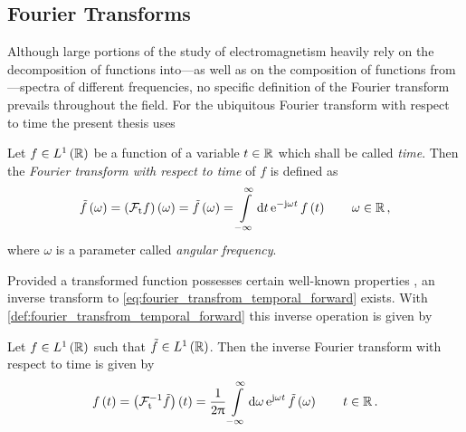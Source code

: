 \subsection{Fourier Transforms}

Although large portions of the study of electromagnetism heavily rely on the
decomposition of functions into---as well as on the composition of functions
from---spectra of different frequencies, no specific definition of the Fourier
transform prevails throughout the field.
For the ubiquitous Fourier transform with respect to time the present thesis
uses
\begin{definition}
	\label{def:fourier_transfrom_temporal_forward}
	Let $f \in L^1\left( \mathbb{R} \right)$ be a function of a variable $t \in \mathbb{R}$
	which shall be called \emph{time}.
	Then the \emph{Fourier transform with respect to time} of $f$ is defined as 
	\begin{equation}\label{eq:fourier_transfrom_temporal_forward}
		\tilde{f} \left(\omega\right) = 
		\left( \mathcal{F}_{\mathrm{t}} f \right) \left(\omega\right) = 
		\tilde{f} \left( \omega \right) =
		\int\limits_{-\infty}^{\infty} \mathrm{d} t \,
		\mathrm{e}^{-\mathrm{j} \omega t}\, 
		f\left( t \right)
		\qquad \omega \in \mathbb{R}
		\, ,
	\end{equation}
	where $\omega$ is a parameter called \emph{angular frequency}.
\end{definition}
Provided a transformed function possesses certain well-known properties
\cite{heuser2006, strichartz2003}, an inverse transform to
\eqref{eq:fourier_transfrom_temporal_forward} exists.
With \cref{def:fourier_transfrom_temporal_forward}  this inverse operation is
given by
\begin{lemma}
	Let $f \in L^1 \left(\mathbb{R}\right)$ such that
	$\tilde{f} \in L^1 \left(\mathbb{R}\right)$. Then the
	inverse Fourier transform with respect to time is given by
	\begin{equation}\label{eq:fourier_transform_temporal_backward}
		f \left(t\right) =
		\left( \mathcal{F}_{\mathrm{t}}^{-1} \tilde{f} \right)
		\left( t \right) = 
		\frac{1}{2\uppi}
		\int\limits_{-\infty}^{\infty} \mathrm{d} \omega \,
		\mathrm{e}^{\mathrm{j} \omega t}\, 
		\tilde{f} \left( \omega \right)
		\qquad t \in \mathbb{R}
		\, .
	\end{equation}
\end{lemma}

